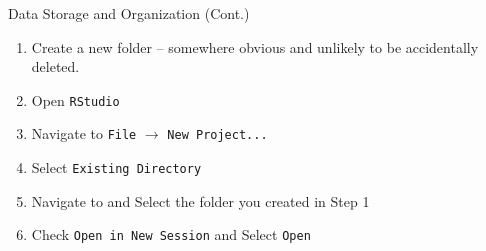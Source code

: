 \documentclass[
  ignorenonframetext,
]{beamer}
\begin{document}
\begin{frame}{Data Storage and Organization (Cont.)}
\label{data-storage-and-organization-cont.-1}
\begin{enumerate}

\item Create a new folder -- somewhere obvious and unlikely to be accidentally deleted. \par \vspace{1.5mm}

\item Open \texttt{RStudio} \par \vspace{2.5mm}

\item Navigate to \texttt{File} $\rightarrow$ \texttt{New Project...} \par \vspace{1.5mm}

\item Select \texttt{Existing Directory} \par \vspace{1.5mm}

\item Navigate to and Select the folder you created in Step 1 \par \vspace{1.5mm}

\item Check \texttt{Open in New Session} and Select \texttt{Open} \par \vspace{1.5mm}

\end{enumerate}
\end{frame}
\end{document}
